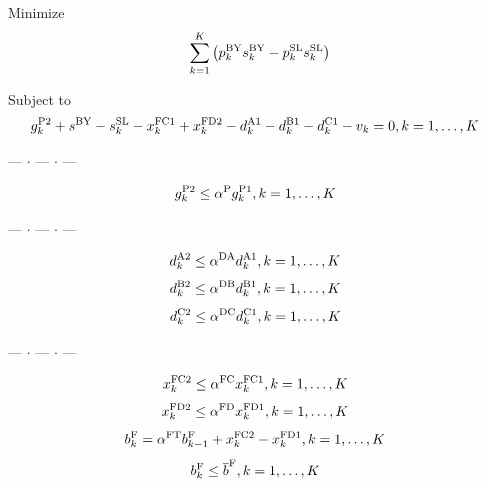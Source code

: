 \documentclass{jarticle}
\begin{document}
\noindent
{\rm Minimize}
\begin{equation}
 \sum_{k=1}^{K} \left( p^{\rm BY}_{k}s^{\rm BY}_{k} - p^{\rm SL}_{k}s^{\rm SL}_{k} \right)
 \label{eq:minimize}
\end{equation}

\noindent
{\rm Subject to}
%
\begin{equation}
 g^{\rm P2}_{k} + s^{\rm BY} - s^{\rm SL}_{k}
 - x^{\rm FC1}_{k} + x^{\rm FD2}_{k} 
 - d^{\rm A1}_{k} - d^{\rm B1}_{k} - d^{\rm C1}_{k} - v_k = 0,
 \hfill
 k=1,\ldots,K
~~
\end{equation}
%
\begin{center} --- $ \cdot $ --- $ \cdot $ --- \end{center}
%
\begin{equation}
 g^{\rm P2}_{k} \le \alpha^{\rm P} g^{\rm P1}_{k} ,
 \hfill
 k=1,\ldots,K
 ~~
 \label{eq:gP1gP2}
\end{equation}
%
\begin{center} --- $ \cdot $ --- $ \cdot $ --- \end{center}
%
\begin{equation}
 d^{\rm A2}_{k} \le \alpha^{\rm DA} d^{\rm A1}_{k} ,
 \hfill
 k=1,\ldots,K
~~
 \label{eq:dA1A2}
\end{equation}
%
\begin{equation}
 d^{\rm B2}_{k} \le \alpha^{\rm DB} d^{\rm B1}_{k},
 \hfill
 k=1,\ldots,K
~~
 \label{eq:dB1B2}
\end{equation}
%
\begin{equation}
 d^{\rm C2}_{k} \le \alpha^{\rm DC} d^{\rm C1}_{k},
 \hfill
 k=1,\ldots,K
~~
 \label{eq:dC1C2}
\end{equation}
%
\begin{center} --- $ \cdot $ --- $ \cdot $ --- \end{center}
%
\begin{equation}
 x^{\rm FC2}_{k} \le \alpha^{\rm FC}x^{\rm FC1}_{k},
 \hfill
 k=1,\ldots,K
~~
 \label{eq:xFC1FC2}
\end{equation}
%
\begin{equation}
 x^{\rm FD2}_{k} \le \alpha^{\rm FD} x^{\rm FD1}_{k} ,
 \hfill
 k=1,\ldots,K
~~
 \label{eq:FD1FD2}
\end{equation}
%
\begin{equation}
 b^{\rm F}_{k} = \alpha^{\rm FT} b^{\rm F}_{k-1} + x^{\rm FC2}_{k} - x^{\rm FD1}_{k},
 \hfill
 k=1,\ldots,K
~~
\end{equation}
%
\begin{equation}
 b^{\rm F}_{k} \le \overline{b}^{\rm F},
 \hfill
 k=1,\ldots,K
~~
\end{equation}
\end{document}
